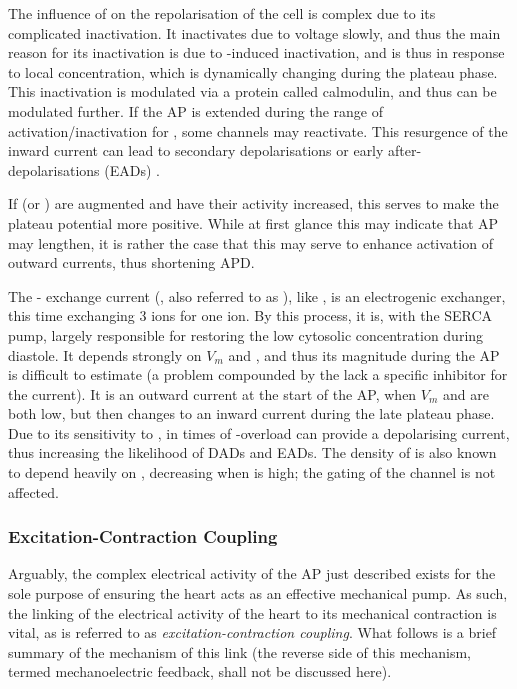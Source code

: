 \documentclass[../thesis-main.tex]{subfiles}
\begin{document}
 The influence of \ica{} on the repolarisation of the cell is complex due to its complicated inactivation. It inactivates due to voltage slowly, and thus the main reason for its inactivation is due to \ca{}-induced inactivation, and is thus in response to local \ca{} concentration, which is dynamically changing during the plateau phase. This inactivation is modulated via a protein called calmodulin, and thus can be modulated further. If the AP is extended during the range of activation/inactivation for \ica{}, some \ica{} channels may reactivate. This resurgence of the inward current can lead to secondary depolarisations or early after-depolarisations (EADs) \citep{Carmeliet2006}. 
 
 If \ica{} (or \ina{}) are augmented and have their activity increased, this serves to make the plateau potential more positive. While at first glance this may indicate that AP may lengthen, it is rather the case that this may serve to enhance activation of outward \K{} currents, thus shortening APD.
 
 The \na{}-\ca{} exchange current (\inaca{}, also referred to as \incx{}), like \inaca, is an electrogenic exchanger, this time exchanging 3 \na{} ions for one \ca{} ion. By this process, it is, with the SERCA pump, largely responsible for restoring the low cytosolic \ca{} concentration during diastole. It depends strongly on $V_m$ and \cai{}, and thus its magnitude during the AP is difficult to estimate (a problem compounded by the lack a specific inhibitor for the current). It is an outward current at the start of the AP, when $V_m$ and \cai{} are both low, but then changes to an inward current during the late plateau phase. Due to its sensitivity to \cai{}, in times of \ca{}-overload \inaca{} can provide a depolarising current, thus increasing the likelihood of DADs and EADs. The density of \ina{} is also known to depend heavily on \cai{}, decreasing when \cai{} is high; the gating of the channel is not affected.
 
 \subsubsection{Excitation-Contraction Coupling}
 \label{subsubsec:ecc}
 Arguably, the complex electrical activity of the AP just described exists for the sole purpose of ensuring the heart acts as an effective mechanical pump. As such, the linking of the electrical activity of the heart to its mechanical contraction is vital, as is referred to as \emph{excitation-contraction coupling}. What follows is a brief summary of the mechanism of this link (the reverse side of this mechanism, termed mechanoelectric feedback, shall not be discussed here).
 
\end{document}
